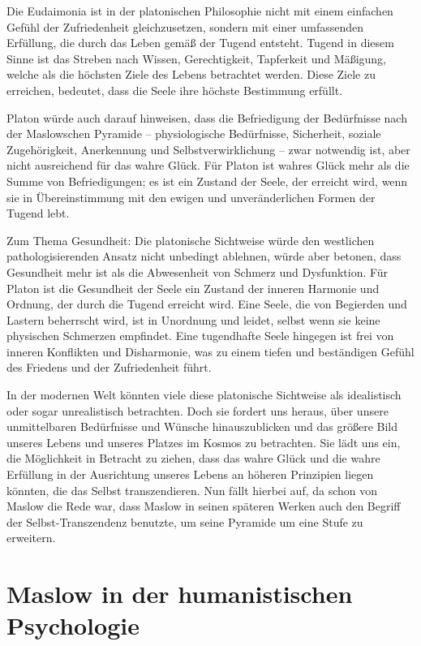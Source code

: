 \documentclass[12pt,a4paper]{article}
\begin{document}
Die Eudaimonia ist in der platonischen Philosophie nicht mit einem einfachen Gefühl der Zufriedenheit gleichzusetzen, sondern mit einer umfassenden Erfüllung, die durch das Leben gemäß der Tugend entsteht. Tugend in diesem Sinne ist das Streben nach Wissen, Gerechtigkeit, Tapferkeit und Mäßigung, welche als die höchsten Ziele des Lebens betrachtet werden. Diese Ziele zu erreichen, bedeutet, dass die Seele ihre höchste Bestimmung erfüllt.

Platon würde auch darauf hinweisen, dass die Befriedigung der Bedürfnisse nach der Maslowschen Pyramide – physiologische Bedürfnisse, Sicherheit, soziale Zugehörigkeit, Anerkennung und Selbstverwirklichung – zwar notwendig ist, aber nicht ausreichend für das wahre Glück. Für Platon ist wahres Glück mehr als die Summe von Befriedigungen; es ist ein Zustand der Seele, der erreicht wird, wenn sie in Übereinstimmung mit den ewigen und unveränderlichen Formen der Tugend lebt.

Zum Thema Gesundheit: Die platonische Sichtweise würde den westlichen pathologisierenden Ansatz nicht unbedingt ablehnen, würde aber betonen, dass Gesundheit mehr ist als die Abwesenheit von Schmerz und Dysfunktion. Für Platon ist die Gesundheit der Seele ein Zustand der inneren Harmonie und Ordnung, der durch die Tugend erreicht wird. Eine Seele, die von Begierden und Lastern beherrscht wird, ist in Unordnung und leidet, selbst wenn sie keine physischen Schmerzen empfindet. Eine tugendhafte Seele hingegen ist frei von inneren Konflikten und Disharmonie, was zu einem tiefen und beständigen Gefühl des Friedens und der Zufriedenheit führt.

In der modernen Welt könnten viele diese platonische Sichtweise als idealistisch oder sogar unrealistisch betrachten. Doch sie fordert uns heraus, über unsere unmittelbaren Bedürfnisse und Wünsche hinauszublicken und das größere Bild unseres Lebens und unseres Platzes im Kosmos zu betrachten. Sie lädt uns ein, die Möglichkeit in Betracht zu ziehen, dass das wahre Glück und die wahre Erfüllung in der Ausrichtung unseres Lebens an höheren Prinzipien liegen könnten, die das Selbst transzendieren. Nun fällt hierbei auf, da schon von Maslow die Rede war, dass Maslow in seinen späteren Werken auch den Begriff der Selbst-Transzendenz benutzte, um seine Pyramide um eine Stufe zu erweitern.


\section{Maslow in der humanistischen Psychologie}
\end{document}
